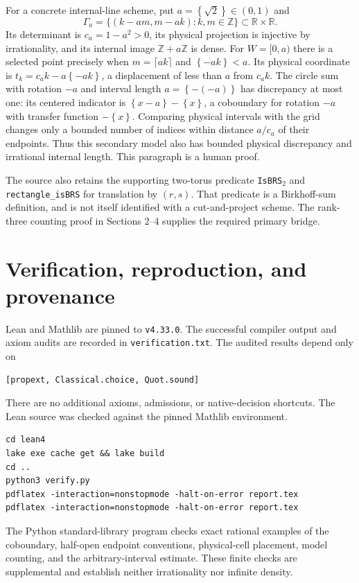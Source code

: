 \documentclass[11pt]{article}
\newcommand{\fr}[1]{\left\{#1\right\}}
\newcommand{\R}{\mathbb R}
\newcommand{\Z}{\mathbb Z}
\begin{document}
For a concrete internal-line scheme, put $a=\fr{\sqrt2}\in(0,1)$ and
\[
 \Gamma_a=\{(k-am,m-ak):k,m\in\Z\}\subset\R\times\R.
\]
Its determinant is $c_a=1-a^2>0$, its physical projection is injective
by irrationality, and its internal image $\Z+a\Z$ is dense.
For $W=[0,a)$ there is a selected point precisely when
$m=\lceil ak\rceil$ and $\fr{-ak}<a$. Its physical coordinate is
$t_k=c_a k-a\fr{-ak}$, a displacement of less than $a$ from $c_a k$.
The circle sum with rotation $-a$ and interval length
$a=\fr{-(-a)}$ has discrepancy at most one: its centered indicator is
$\fr{x-a}-\fr{x}$, a coboundary for rotation $-a$ with transfer function
$-\fr{x}$. Comparing physical intervals with the grid changes only a
bounded number of indices within distance $a/c_a$ of their endpoints.
Thus this secondary model also has bounded physical discrepancy and
irrational internal length. This paragraph is a human proof.

The source also retains the supporting two-torus predicate
\nolinkurl{IsBRS}$ _2$ and \nolinkurl{rectangle_isBRS} for translation by
$(r,s)$. That predicate is a Birkhoff-sum definition, and is not itself
identified with a cut-and-project scheme. The rank-three counting proof
in Sections 2--4 supplies the required primary bridge.

\section{Verification, reproduction, and provenance}
Lean and Mathlib are pinned to \nolinkurl{v4.33.0}. The successful compiler
output and axiom audits are recorded in \nolinkurl{verification.txt}.
The audited results depend only on
\begin{lstlisting}
[propext, Classical.choice, Quot.sound]
\end{lstlisting}
There are no additional axioms, admissions, or native-decision shortcuts.
The Lean source was checked against the pinned Mathlib environment.
\begin{lstlisting}
cd lean4
lake exe cache get && lake build
cd ..
python3 verify.py
pdflatex -interaction=nonstopmode -halt-on-error report.tex
pdflatex -interaction=nonstopmode -halt-on-error report.tex
\end{lstlisting}
The Python standard-library program checks exact rational examples of
the coboundary, half-open endpoint conventions, physical-cell placement,
model counting, and the arbitrary-interval estimate. These finite checks
are supplemental and establish neither irrationality nor infinite density.
\end{document}
